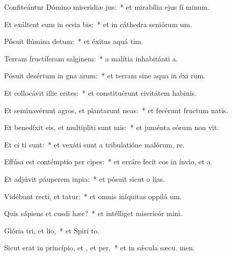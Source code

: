 \item Confiteántur Dómino miseridiæ jus:~* et mirabília ejus fí minum.
\item Et exáltent eum in ecsia bis:~* et in cáthedra seniórum  um.
\item Pósuit flúmina  detum:~* et éxitus aquá  tim.
\item Terram fructíferam  salginem:~* a malítia inhabitánti  a.
\item Pósuit desértum in gna arum:~* et terram sine aqua in éxi rum.
\item Et collocávit illic erites:~* et constituérunt civitátem habinis.
\item Et seminavérunt agros, et plantarunt neas:~* et fecérunt fructum natis.
\item Et benedíxit eis, et multipliti sunt mis:~* et juménta eórum non vit.
\item Et ci ti sunt:~* et vexáti sunt a tribulatióne malórum,  re.
\item Effúsa est contémptio per cipes:~* et erráre fecit eos in ínvio, et   a.
\item Et adjúvit páuperem  inpia:~* et pósuit sicut o lias.
\item Vidébunt recti, et tatur:~* et omnis iníquitas oppilá  um.
\item Quis sápiens et cusdi hæc?~* et intélliget misericór mini.
\item Glória tri, et lio,~* et Spirí to.
\item Sicut erat in princípio, et , et per,~* et in sǽcula sæcu. men.
